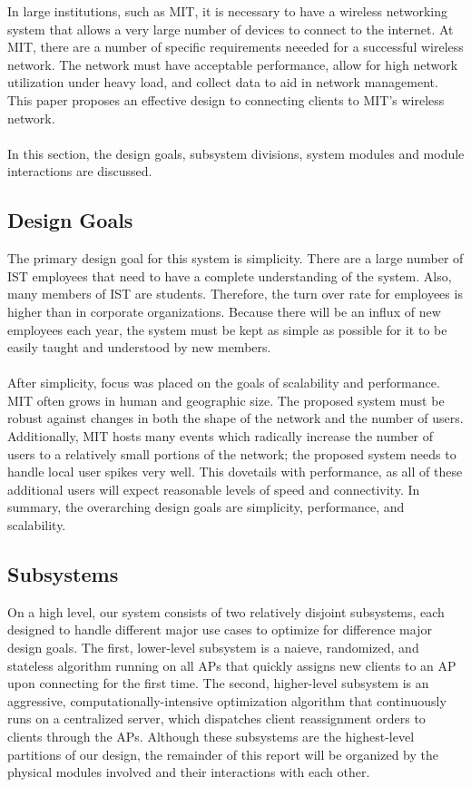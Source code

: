 \documentclass[10pt,journal,compsoc]{IEEEtran}
\begin{document}
		In large institutions, such as MIT, it is necessary to have a wireless networking system that allows a very large number of devices to connect to the internet. At MIT, there are a number of specific requirements neeeded for a successful wireless network. The network must have acceptable performance, allow for high network utilization under heavy load, and collect data to aid in network management. This paper proposes an effective design to connecting clients to MIT's wireless network.\\
        \\
        In this section, the design goals, subsystem divisions, system modules and module interactions are discussed.
        
        \subsection{Design Goals}
        
        The primary design goal for this system is simplicity. There are a large number of IST employees that need to have a complete understanding of the system. Also, many members of IST are students. Therefore, the turn over rate for employees is higher than in corporate organizations. Because there will be an influx of new employees each year, the system must be kept as simple as possible for it to be easily taught and understood by new members.\\
        \\
        After simplicity, focus was placed on the goals of scalability and performance. MIT often grows in human and geographic size. The proposed system must be robust against changes in both the shape of the network and the number of users. Additionally, MIT hosts many events which radically increase the number of users to a relatively small portions of the network; the proposed system needs to handle local user spikes very well. This dovetails with performance, as all of these additional users will expect reasonable levels of speed and connectivity. In summary, the overarching design goals are simplicity, performance, and scalability. 
        
        \subsection{Subsystems}
        On a high level, our system consists of two relatively disjoint subsystems, each designed to handle different major use cases to optimize for difference major design goals. The first, lower-level subsystem is a naieve, randomized, and stateless algorithm running on all APs that quickly assigns new clients to an AP upon connecting for the first time. The second, higher-level subsystem is an aggressive, computationally-intensive optimization algorithm that continuously runs on a centralized server, which dispatches client reassignment orders to clients through the APs. Although these subsystems are the highest-level partitions of our design, the remainder of this report will be organized by the physical modules involved and their interactions with each other.
        
\end{document}
